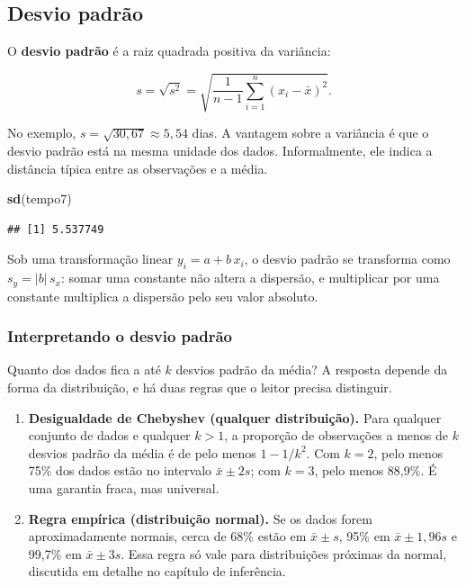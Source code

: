 \documentclass[
]{book}
\newenvironment{Shaded}{\begin{snugshade}}{\end{snugshade}}
\newcommand{\FunctionTok}[1]{\textcolor[rgb]{0.13,0.29,0.53}{\textbf{#1}}}
\newcommand{\NormalTok}[1]{#1}
\providecommand{\tightlist}{%
  \setlength{\itemsep}{0pt}\setlength{\parskip}{0pt}}
\begin{document}
\subsection{Desvio padrão}\label{desvio-padruxe3o}

O \textbf{desvio padrão} é a raiz quadrada positiva da variância:

\[
s = \sqrt{s^2} = \sqrt{\frac{1}{n-1}\sum_{i=1}^{n}(x_i - \bar{x})^2}.
\]

No exemplo, \(s = \sqrt{30{,}67} \approx 5{,}54\) dias. A vantagem sobre a variância é que o desvio padrão está na mesma unidade dos dados. Informalmente, ele indica a distância típica entre as observações e a média.

\begin{Shaded}
\begin{Highlighting}[]
\FunctionTok{sd}\NormalTok{(tempo7)}
\end{Highlighting}
\end{Shaded}

\begin{verbatim}
## [1] 5.537749
\end{verbatim}

Sob uma transformação linear \(y_i = a + b\,x_i\), o desvio padrão se transforma como \(s_y = |b|\,s_x\): somar uma constante não altera a dispersão, e multiplicar por uma constante multiplica a dispersão pelo seu valor absoluto.

\subsubsection{Interpretando o desvio padrão}\label{interpretando-o-desvio-padruxe3o}

Quanto dos dados fica a até \(k\) desvios padrão da média? A resposta depende da forma da distribuição, e há duas regras que o leitor precisa distinguir.

\begin{enumerate}
\def\labelenumi{\arabic{enumi}.}
\tightlist
\item
  \textbf{Desigualdade de Chebyshev (qualquer distribuição).} Para qualquer conjunto de dados e qualquer \(k > 1\), a proporção de observações a menos de \(k\) desvios padrão da média é de pelo menos \(1 - 1/k^2\). Com \(k = 2\), pelo menos 75\% dos dados estão no intervalo \(\bar{x} \pm 2s\); com \(k = 3\), pelo menos 88,9\%. É uma garantia fraca, mas universal.
\item
  \textbf{Regra empírica (distribuição normal).} Se os dados forem aproximadamente normais, cerca de 68\% estão em \(\bar{x} \pm s\), 95\% em \(\bar{x} \pm 1{,}96s\) e 99,7\% em \(\bar{x} \pm 3s\). Essa regra só vale para distribuições próximas da normal, discutida em detalhe no capítulo de inferência.
\end{enumerate}
\end{document}
